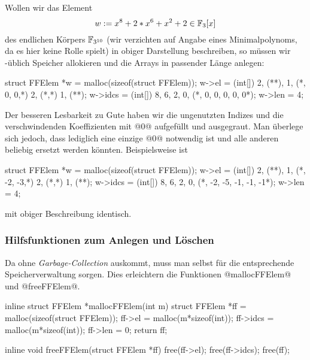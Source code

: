 \begin{beispiel}
  Wollen wir das Element 
  \[ w := x^8 + 2*x^6 + x^2 + 2 \in \mathbb{F}_3[x]\]
  des endlichen Körpers $\mathbb{F}_{3^{10}}$ 
  (wir verzichten auf Angabe eines Minimalpolynoms, da es hier keine
  Rolle spielt) in obiger Darstellung beschreiben, so müssen wir \Clang-üblich
  Speicher allokieren und die Arrays in passender Länge anlegen:
  \begin{cexample}
    struct FFElem *w = malloc(sizeof(struct FFElem));
    w->el = (int[]) {2, (**), 1, (*, 0, 0,*) 2, (*,*) 1, (**)};
    w->idcs = (int[]) {8, 6, 2, 0, (*, 0, 0, 0, 0, 0*)};
    w->len = 4;
  \end{cexample}
  Der besseren Lesbarkeit zu Gute haben wir die ungenutzten Indizes und die 
  verschwindenden Koeffizienten mit @0@ aufgefüllt und ausgegraut. 
  Man überlege sich jedoch,
  dass lediglich eine einzige @0@ notwendig ist und alle anderen 
  beliebig ersetzt werden könnten. Beispielsweise ist
  \begin{cexample}
    struct FFElem *w = malloc(sizeof(struct FFElem));
    w->el = (int[]) {2, (**), 1, (*, -2, -3,*) 2, (*,*) 1, (**)};
    w->idcs = (int[]) {8, 6, 2, 0, (*, -2, -5, -1, -1, -1*)};
    w->len = 4;
  \end{cexample}
  mit obiger Beschreibung identisch.
\end{beispiel}


\subsubsection{Hilfsfunktionen zum Anlegen und Löschen}

Da \Clang ohne \emph{Garbage-Collection} auskommt, muss man selbst für die
entsprechende Speicherverwaltung sorgen. Dies erleichtern die Funktionen
@mallocFFElem@ und @freeFFElem@.

\begin{ccode}[caption={Aus \url{../Sage/enumeratePCNs.c}}]
inline struct FFElem *mallocFFElem(int m){
    struct FFElem *ff = malloc(sizeof(struct FFElem));
    ff->el = malloc(m*sizeof(int));
    ff->idcs = malloc(m*sizeof(int));
    ff->len = 0;
    return ff;
}
\end{ccode}

\begin{ccode}[caption={Aus \url{../Sage/enumeratePCNs.c}}]
inline void freeFFElem(struct FFElem *ff){
    free(ff->el);
    free(ff->idcs);
    free(ff);
}
\end{ccode}

